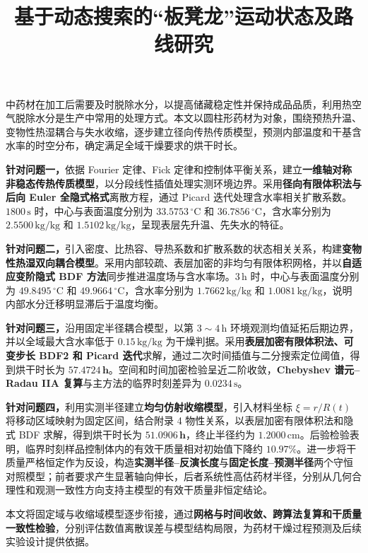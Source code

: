 \documentclass[withoutpreface,bwprint]{cumcmthesis}
\title{基于动态搜索的“板凳龙”运动状态及路线研究}
\makeatletter
\renewenvironment{abstract}{%
\if@twocolumn
    \section*{\abstractname}%
  \else
   \begin{center}%
  {\zihao{4}\bfseries \abstractname\vspace{-.5em}\vspace{\z@}}%
   \end{center}%
   \quotation
  \fi}
  {\if@twocolumn\else\endquotation\clearpage\fi}
\makeatother
\begin{document}
\maketitle

\begin{abstract}
中药材在加工后需要及时脱除水分，以提高储藏稳定性并保持成品品质，利用热空气脱除水分是生产中常用的处理方式。本文以圆柱形药材为对象，围绕预热升温、变物性热湿耦合与失水收缩，逐步建立径向传热传质模型，预测内部温度和干基含水率的时空分布，确定满足全域干燥要求的烘干时长。

\textbf{针对问题一，}依据 Fourier 定律、Fick 定律和控制体平衡关系，建立\textbf{一维轴对称非稳态传热传质模型}，以分段线性插值处理实测环境边界。采用\textbf{径向有限体积法与后向 Euler 全隐式格式}离散方程，通过 Picard 迭代处理含水率相关扩散系数。$1800\,\mathrm{s}$ 时，中心与表面温度分别为 $33.5753\,{}^\circ\mathrm{C}$ 和 $36.7856\,{}^\circ\mathrm{C}$，含水率分别为 $2.5500\,\mathrm{kg/kg}$ 和 $1.5102\,\mathrm{kg/kg}$，呈现表层先升温、先失水的特征。

\textbf{针对问题二，}引入密度、比热容、导热系数和扩散系数的状态相关关系，构建\textbf{变物性热湿双向耦合模型}。采用内部较疏、表层加密的非均匀有限体积网格，并以\textbf{自适应变阶隐式 BDF 方法}同步推进温度场与含水率场。$3\,\mathrm{h}$ 时，中心与表面温度分别为 $49.8495\,{}^\circ\mathrm{C}$ 和 $49.9664\,{}^\circ\mathrm{C}$，含水率分别为 $1.7662\,\mathrm{kg/kg}$ 和 $1.0081\,\mathrm{kg/kg}$，说明内部水分迁移明显滞后于温度均衡。

\textbf{针对问题三，}沿用固定半径耦合模型，以第 $3\sim4\,\mathrm{h}$ 环境观测均值延拓后期边界，并以全域最大含水率低于 $0.15\,\mathrm{kg/kg}$ 为干燥判据。采用\textbf{表层加密有限体积法、可变步长 BDF2 和 Picard 迭代}求解，通过二次时间插值与二分搜索定位阈值，得到烘干时长为 $\mathbf{57.4724\,h}$。空间和时间加密检验呈近二阶收敛，\textbf{Chebyshev 谱元--Radau IIA 复算}与主方法的临界时刻差异为 $0.0234\,\mathrm{s}$。

\textbf{针对问题四，}利用实测半径建立\textbf{均匀仿射收缩模型}，引入材料坐标 $\xi=r/R(t)$ 将移动区域映射为固定区间，结合附录 4 物性关系，以表层加密有限体积法和隐式 BDF 求解，得到烘干时长为 $\mathbf{51.0906\,h}$，终止半径约为 $1.2000\,\mathrm{cm}$。后验检验表明，临界时刻样品控制体内的有效干质量相对初始值下降约 $10.97\%$。进一步将干质量严格恒定作为反设，构造\textbf{实测半径--反演长度}与\textbf{固定长度--预测半径}两个守恒对照模型；前者要求产生显著轴向伸长，后者系统性高估药材半径，分别从几何合理性和观测一致性方向支持主模型的有效干质量非恒定结论。

本文将固定域与收缩域模型逐步衔接，通过\textbf{网格与时间收敛、跨算法复算和干质量一致性检验}，分别评估数值离散误差与模型结构局限，为药材干燥过程预测及后续实验设计提供依据。

\end{abstract}
\end{document}
